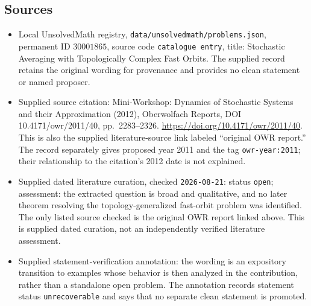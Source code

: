 \documentclass[11pt]{article}
\begin{document}
\subsection{Sources}
\begin{itemize}
\item Local UnsolvedMath registry, \texttt{data/unsolvedmath/problems.json}, permanent ID \(30001865\), source code \texttt{catalogue entry}, title: Stochastic Averaging with Topologically Complex Fast Orbits. The supplied record retains the original wording for provenance and provides no clean statement or named proposer.
\item Supplied source citation: Mini-Workshop: Dynamics of Stochastic Systems and their Approximation (2012), Oberwolfach Reports, DOI 10.4171/owr/2011/40, pp.\ 2283--2326. \url{https://doi.org/10.4171/owr/2011/40}. This is also the supplied literature-source link labeled ``original OWR report.'' The record separately gives proposed year 2011 and the tag \texttt{owr-year:2011}; their relationship to the citation's 2012 date is not explained.
\item Supplied dated literature curation, checked \texttt{2026-08-21}: status \texttt{open}; assessment: the extracted question is broad and qualitative, and no later theorem resolving the topology-generalized fast-orbit problem was identified. The only listed source checked is the original OWR report linked above. This is supplied dated curation, not an independently verified literature assessment.
\item Supplied statement-verification annotation: the wording is an expository transition to examples whose behavior is then analyzed in the contribution, rather than a standalone open problem. The annotation records statement status \texttt{unrecoverable} and says that no separate clean statement is promoted.
\end{itemize}
\end{document}
